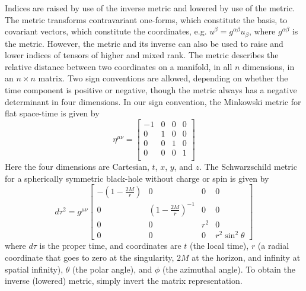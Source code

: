 Indices are raised by use of the inverse metric and lowered by use of the metric. The metric transforms contravariant one-forms, which constitute the basis, to covariant vectors, which constitute the coordinates, e.g. $u^\beta=g^{\alpha\beta}u_\beta$, where $g^{\alpha\beta}$ is the metric. However, the metric and its inverse can also be used to raise and lower indices of tensors of higher and mixed rank. The metric describes the relative distance between two coordinates on a manifold, in all $n$ dimensions, in an $n\times n$ matrix. Two sign conventions are allowed, depending on whether the time component is positive or negative, though the metric always has a negative determinant in four dimensions. In our sign convention, the Minkowski metric for flat space-time is given by
\[
\eta^{\mu\nu}=
\begin{bmatrix}
  -1 & 0 & 0 & 0\\
  0 & 1 & 0 & 0\\
  0 & 0 & 1 & 0\\
  0 & 0 & 0 & 1\\
\end{bmatrix}
\]
Here the four dimensions are Cartesian, $t$, $x$, $y$, and $z$. The Schwarzschild metric for a spherically symmetric black-hole without charge or spin is given by
\[
d\tau^2=g^{\mu\nu}
\begin{bmatrix}
  -(1-\frac{2M}{r}) & 0 & 0 & 0\\
  0 & (1-\frac{2M}{r})^{-1} & 0 &0\\
  0 & 0 & r^2 & 0\\
  0 & 0 & 0 & r^2\sin^2\theta
\end{bmatrix}
\]
where $d\tau$ is the proper time, and coordinates are $t$ (the local time), $r$ (a radial coordinate that goes to zero at the singularity, $2M$ at the horizon, and infinity at spatial infinity), $\theta$ (the polar angle), and $\phi$ (the azimuthal angle). To obtain the inverse (lowered) metric, simply invert the matrix representation.


